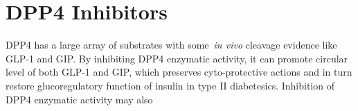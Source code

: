 \section{DPP4 Inhibitors}
DPP4 has a large array of substrates with some~\textit{in vivo} cleavage evidence like GLP-1 and GIP. By inhibiting DPP4 enzymatic activity, it can promote circular level of both GLP-1 and GIP, which preserves cyto-protective actions and in turn restore glucoregulatory function of insulin in type II diabetesics. Inhibition of DPP4 enzymatic activity may also 